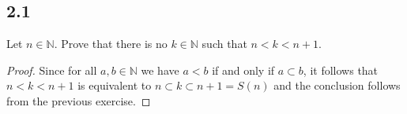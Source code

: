 \subsection*{2.1} Let $n \in \mathbb{N}$. Prove that there is no $k \in \mathbb{N}$ such that $n < k < n+1$.

\begin{proof}
Since for all $a, b \in \mathbb{N}$ we have $a < b$ if and only if $a \subset b$, it follows that $n < k < n+1$ is equivalent to $n \subset k \subset n+1 = S(n)$ and the conclusion follows from the previous exercise.
\end{proof}

